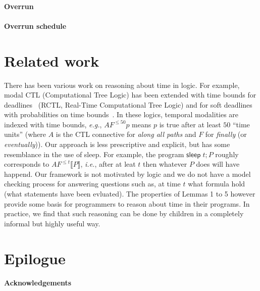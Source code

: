 \documentclass[preprint]{sigplanconf}
\renewcommand{\leq}{\leqslant}
\newcommand{\note}[1]{{\color{blue}{#1}}}
\theoremstyle{definition}
\newcommand{\sleep}{\mathsf{sleep}\;}
\newcommand{\sleepOp}{\textsf{sleep}}
\newcommand{\interp}[1]{\llbracket{#1}\rrbracket}
\newcommand{\ie}{\emph{i.e.}}
\newcommand{\eg}{\emph{e.g.}}
\begin{document}
\paragraph{Overrun}

\note{TODO: report warnings when overrun occurs- should be easy I think
by adding stuff to sleep.}

\paragraph{Overrun schedule}

\note{TOOD: Again pretty easy, just need some info in the monad
to say what counts as a bad overrun}

\section{Related work}

There has been various work on reasoning about time in logic. For
example, modal CTL (Computational Tree Logic) has been extended with
time bounds for deadlines~\cite{emerson1991quantitative} (RCTL,
Real-Time Computational Tree Logic) and for soft deadlines with
probabilities on time bounds~\cite{hansson1994logic}. In these logics,
temporal modalities are indexed with time bounds, \eg{}, $AF^{\leq 50}
p$ means $p$ is true after at least $50$ ``time units'' (where $A$ is
the CTL connective for \emph{along all paths} and $F$ for
\emph{finally} (or \emph{eventually})). Our approach is less
prescriptive and explicit, but has some resemblance in the use of
\sleepOp{}. For example, the program $\sleep t ; P$ roughly
corresponds to $AF^{\leq t} \interp{P}$, \ie{}, after at leat $t$ then
whatever $P$ does will have happend. Our framework is not motivated by
logic and we do not have a model checking process for answering
questions such as, at time $t$ what formula hold (what statements have
been evluated).  The properties of Lemmas 1 to 5 however provide some
basis for programmers to reason about time in their programs. In
practice, we find that such reasoning can be done by children in a
completely informal but highly useful way.



\section{Epilogue}

\note{TODO}

\paragraph{Acknowledgements}
\end{document}
